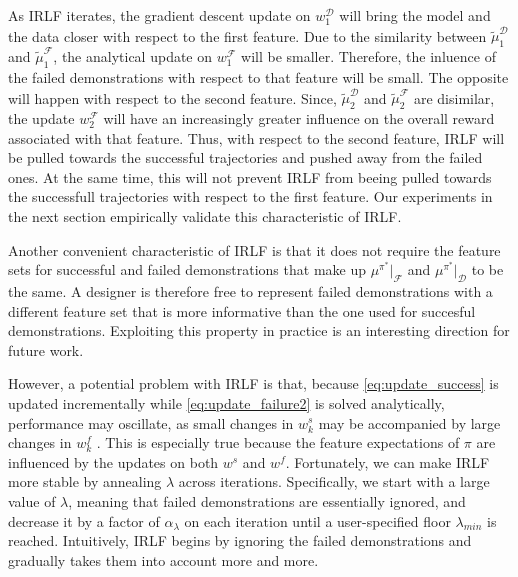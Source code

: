\documentclass{aamas2016}
\newcommand{\sw}[1]{\textcolor{red}{SW: #1}}
\newcommand{\jm}[1]{\textcolor{blue}{Joao: #1}}
\newcommand{\ks}[1]{\textcolor{dark_green}{Kyriacos: #1}}
\newcommand{\sw}[1]{}
\newcommand{\jm}[1]{}
\newcommand{\ks}[1]{}
\begin{document}
As IRLF iterates, the gradient descent update on $w^{\mathcal{D}}_1$ will bring the model and the data closer with respect to the first feature. Due to the similarity between $\widetilde{\mu}^{\mathcal{D}}_1$ and $\widetilde{\mu}^{\mathcal{F}}_1$, the analytical update on $w^{\mathcal{F}}_1$ will be smaller. Therefore, the inluence of the failed demonstrations with respect to that feature will be small. The opposite will happen with respect to the second feature. Since, $\widetilde{\mu}^{\mathcal{D}}_2$ and $\widetilde{\mu}^{\mathcal{F}}_2$ are disimilar, the update $w^{\mathcal{F}}_2$ will have an increasingly greater influence on the overall reward associated with that feature.  Thus, with respect to the second feature, IRLF will be pulled towards the successful trajectories and pushed away from the failed ones.  At the same time, this will not prevent IRLF from beeing pulled towards the successfull trajectories with respect to the first feature.  Our experiments in the next section empirically validate this characteristic of IRLF.

Another convenient characteristic of IRLF is that it does not require the feature sets for successful and failed demonstrations that make up $ \mu^{\pi^*}|_{\mathcal{F}}$ and $ \mu^{\pi^*}|_{\mathcal{D}}$ to be the same. A designer is therefore free to represent failed demonstrations with a different feature set that is more informative than the one used for succesful demonstrations. Exploiting this property in practice is an interesting direction for future work.

However, a potential problem with IRLF is that, because \eqref{eq:update_success} is updated incrementally while \eqref{eq:update_failure2} is solved analytically, performance may oscillate, as small changes in $w^s_k$ may be accompanied by large changes in $w^f_k$ 
.
This is especially true because the feature expectations of $\pi$ are influenced by the updates on both $w^s$ and $w^f$. Fortunately, we can make IRLF more stable by annealing $\lambda$ across iterations.  Specifically, we start with a large value of $\lambda$, meaning that failed demonstrations are essentially ignored, and decrease it by a factor of $\alpha_{\lambda}$ 
on each iteration until a user-specified floor $\lambda_{min}$ 
is reached.  Intuitively, IRLF begins by ignoring the failed demonstrations and gradually takes them into account more and more.
\end{document}
